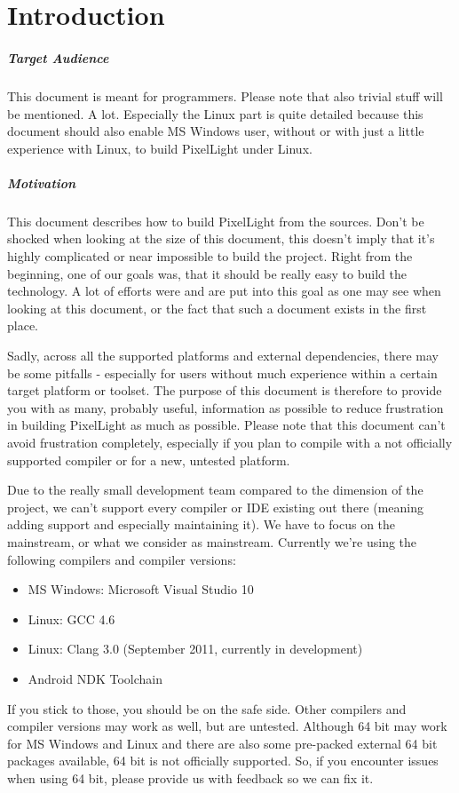 \chapter{Introduction}


\paragraph{Target Audience}
This document is meant for programmers. Please note that also trivial stuff will be mentioned. A lot. Especially the Linux part is quite detailed because this document should also enable MS Windows user, without or with just a little experience with Linux, to build PixelLight under Linux.


\paragraph{Motivation}
This document describes how to build PixelLight from the sources. Don't be shocked when looking at the size of this document, this doesn't imply that it's highly complicated or near impossible to build the project. Right from the beginning, one of our goals was, that it should be really easy to build the technology. A lot of efforts were and are put into this goal as one may see when looking at this document, or the fact that such a document exists in the first place.

Sadly, across all the supported platforms and external dependencies, there may be some pitfalls - especially for users without much experience within a certain target platform or toolset. The purpose of this document is therefore to provide you with as many, probably useful, information as possible to reduce frustration in building PixelLight as much as possible. Please note that this document can't avoid frustration completely, especially if you plan to compile with a not officially supported compiler or for a new, untested platform.

Due to the really small development team compared to the dimension of the project, we can't support every compiler or IDE existing out there (meaning adding support and especially maintaining it). We have to focus on the mainstream, or what we consider as mainstream. Currently we're using the following compilers and compiler versions:
\begin{itemize}
\item{MS Windows: Microsoft Visual Studio 10}
\item{Linux: GCC 4.6}
\item{Linux: Clang 3.0 (September 2011, currently in development)}
\item{Android NDK Toolchain}
\end{itemize}
If you stick to those, you should be on the safe side. Other compilers and compiler versions may work as well, but are untested. Although 64 bit may work for MS Windows and Linux and there are also some pre-packed external 64 bit packages available, 64 bit is not officially supported. So, if you encounter issues when using 64 bit, please provide us with feedback so we can fix it.

